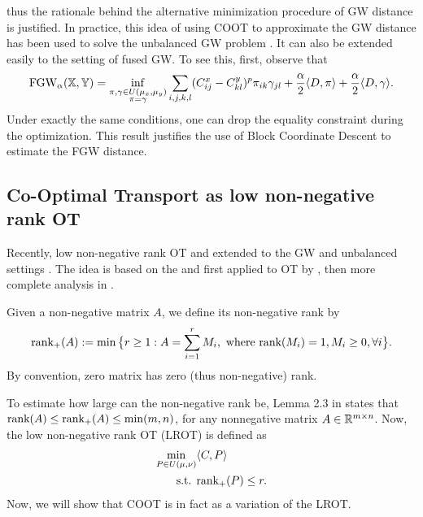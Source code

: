 thus the rationale behind the alternative minimization procedure of GW distance is justified.
In practice, this idea of using COOT to approximate the GW distance has been used to
solve the unbalanced GW problem \citep{Sejourne20,Thual22}. It can also be extended
easily to the setting of fused GW. To see this, first, observe that
\begin{align}
  \text{FGW}_{\alpha}(\mathbb X, \mathbb Y) =
  \inf_{\substack{\pi, \gamma \in U(\mu_x, \mu_y) \\ \pi = \gamma }}
  \sum_{i,j,k,l} (C^x_{ij} - C^y_{kl})^p \pi_{ik} \gamma_{jl} +
  \frac{\alpha}{2} \langle D, \pi \rangle + \frac{\alpha}{2} \langle D, \gamma \rangle.
\end{align}
Under exactly the same conditions, one can drop the equality constraint during the optimization.
This result justifies the use of Block Coordinate Descent to estimate the FGW distance.

\subsection{Co-Optimal Transport as low non-negative rank OT}

Recently, low non-negative rank OT \citep{Meyer21a} and extended to the GW and unbalanced settings
\citep{Meyer21b,Meyer23}. The idea is based on the \citep{Joel93} and first applied to OT by
\citep{Forrow18}, then more complete analysis in \citep{Meyer22}.
\begin{definition}
  Given a non-negative matrix $A$, we define its non-negative rank by
  \begin{equation}
    \text{rank}_{+}(A):= \min \big\{ r \geq 1: A = \sum_{i=1}^r M_i,
    \text{ where } \text{rank}(M_i) = 1, M_i \geq 0, \forall i \big\}.
  \end{equation}
  By convention, zero matrix has zero (thus non-negative) rank.
\end{definition}
To estimate how large can the non-negative rank be, Lemma 2.3 in \citep{Joel93} states that
$\text{rank}(A) \leq \text{rank}_+(A) \leq \min(m, n)$, for any nonnegative matrix $A \in \mathbb R^{m \times n}$.
Now, the low non-negative rank OT (LROT) is defined as
\begin{align}
  \min_{P \in U(\mu, \nu)} &\langle C, P \rangle \\
  \text{ s.t. } &\text{rank}_+(P) \leq r.
\end{align}
Now, we will show that COOT is in fact as a variation of the LROT.

